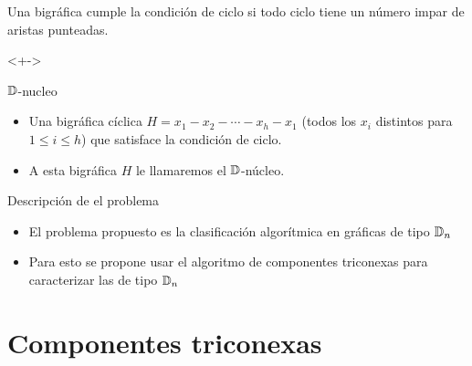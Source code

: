 \documentclass[spanish]{beamer}
\begin{document}
\begin{frame}
	\begin{definitions}
	Una bigráfica cumple la condición de ciclo si todo ciclo tiene un número impar de aristas punteadas.
	\end{definitions}
	\begin{example}<+->
  \centering
  \end{example}
\end{frame}

\begin{frame}{$\mathbb{D}$-nucleo}
  \begin{itemize}
  \item Una bigráfica cíclica $ H = x_{1} - x_{2} - \cdots - x_{h}-x_{1}$ (todos los $x_{i}$ distintos para $ 1 \leq i \leq h$) que satisface la condición de ciclo.
  \item A esta bigráfica $H$ le llamaremos el $\mathbb{D}$-núcleo.
  \end{itemize}
\end{frame}

\begin{frame}{Descripción de el problema}
  \begin{itemize}
     \item El problema propuesto es la clasificación algorítmica en gráficas de tipo $\mathbb{D}_{n}$
     \item Para esto se propone usar el algoritmo de componentes triconexas para caracterizar las de tipo $\mathbb{D}_{n}$
    \end{itemize}	
\end{frame}

\section{Componentes triconexas}
\end{document}
